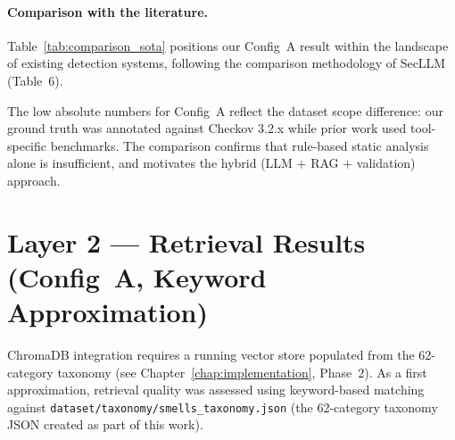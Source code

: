 \documentclass[12pt, a4paper]{report}
\begin{document}
\paragraph{Comparison with the literature.}
Table~\ref{tab:comparison_sota} positions our Config~A result within the landscape
of existing detection systems, following the comparison methodology of
SecLLM~\citep{devito2025secllm} (Table~6).

\begin{table}[H]
  \centering
  \caption{Comparison of Config~A (Checkov baseline) with prior work.}
  \label{tab:comparison_sota}
\end{table}

The low absolute numbers for Config~A reflect the dataset scope difference:
our ground truth was annotated against Checkov 3.2.x while prior work used tool-specific
benchmarks. The comparison confirms that rule-based static analysis alone is insufficient,
and motivates the hybrid (LLM + RAG + validation) approach.

\section{Layer 2 --- Retrieval Results (Config~A, Keyword Approximation)}

ChromaDB integration requires a running vector store populated from the 62-category
taxonomy (see Chapter~\ref{chap:implementation}, Phase~2). As a first approximation,
retrieval quality was assessed using keyword-based matching against
{\small\texttt{dataset/taxonomy/smells\_taxonomy.json}} (the 62-category taxonomy JSON
created as part of this work).
\end{document}
